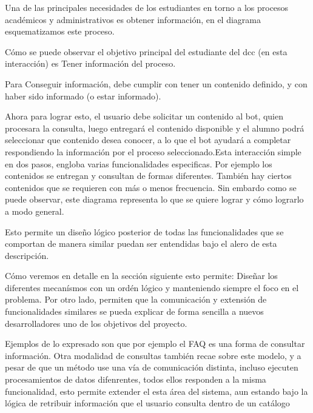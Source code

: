         \par Una de las principales necesidades de los estudiantes en torno a los procesos académicos y administrativos es obtener información, en el diagrama esquematizamos este proceso. 
        \par Cómo se puede observar el objetivo principal del estudiante del dcc (en esta interacción) es Tener información del proceso.
        \par Para Conseguir información, debe cumplir  con tener un contenido definido, y con haber sido informado (o estar informado).
        \par Ahora para lograr esto, el usuario debe solicitar un contenido al bot, quien procesara la consulta, luego entregará el contenido disponible y el alumno podrá seleccionar que contenido desea conocer, a lo que el bot ayudará a completar respondiendo la información por el proceso seleccionado.Esta interacción simple en dos pasos, engloba varias funcionalidades especificas. Por ejemplo los contenidos se entregan y consultan de formas diferentes. También hay ciertos contenidos que se requieren con más o menos frecuencia. Sin embardo como se puede observar, este diagrama representa lo que se quiere lograr y cómo lograrlo a modo general.
        \par Esto permite un diseño lógico posterior de todas las funcionalidades que se comportan de manera similar puedan ser entendidas bajo el alero de esta descripción.
        \par Cómo veremos en detalle en la sección siguiente esto permite: Diseñar los diferentes mecanísmos con un ordén lógico y manteniendo siempre el foco en el problema. Por otro lado, permiten que la comunicación y extensión de funcionalidades similares se pueda explicar de forma sencilla a nuevos desarrolladores uno de los objetivos del proyecto. 
        \par Ejemplos de lo expresado son que por ejemplo el FAQ es una forma de consultar información. Otra modalidad de consultas también recae sobre este modelo, y a pesar de que un método use una vía de comunicación distinta, incluso ejecuten procesamientos de datos difenrentes, todos ellos responden a la misma funcionalidad, esto permite extender el esta área del sistema, aun estando bajo la lógica de retribuir información que el usuario consulta dentro de un catálogo
    
